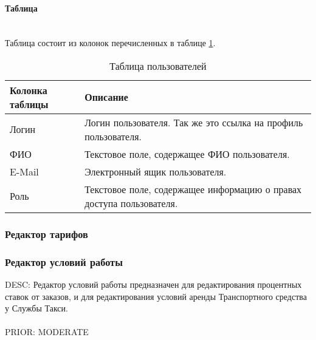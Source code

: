 				\paragraph{Таблица}\mbox{}\\
                	
                   Таблица состоит из колонок перечисленных в таблице \ref{users_table}.
                    
	               \begin{table}[!h]
	               \begin{center}
	               \caption {Таблица пользователей}
                   \label{users_table}
	               \setlength{\extrarowheight}{2mm}
	               \begin{tabular}{|p{5cm}|p{10cm}|}

	                   \hline  \textbf{Колонка таблицы}&\textbf{Описание} \\ [2mm]

	                   \hline  Логин & Логин пользователя. Так же это ссылка на профиль пользователя. \\ [2mm]
	                   \hline  ФИО & Текстовое поле, содержащее ФИО пользователя. \\ [2mm]
	                   \hline  E-Mail & Электронный ящик пользователя. \\ [2mm]
	                   \hline  Роль  & Текстовое поле, содержащее информацию о правах доступа пользователя. \\ [2mm]
	                   \hline
	               \end{tabular}
	               \end{center}
	               \end{table}

		\subsubsection{Редактор тарифов}

		\subsubsection{Редактор условий работы}

			DESC: Редактор условий работы предназначен для редактирования процентных ставок от заказов, и для редактирования условий аренды Транспортного средства у Службы Такси. \\
				
				\\
				PRIOR: MODERATE

